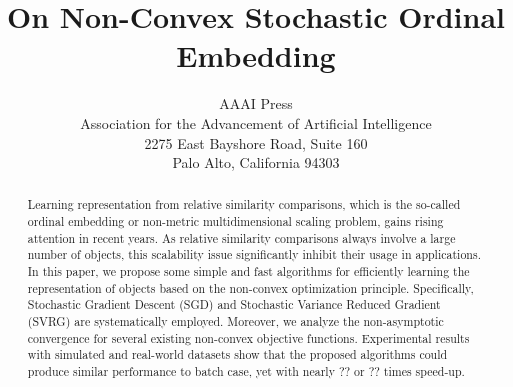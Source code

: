 \documentclass[letterpaper]{article}
\newcommand{\qqxu}[1]{\textcolor[rgb]{0.00,1.00,0.00}{#1}}
\begin{document}
		\title{On Non-Convex Stochastic Ordinal Embedding}
		\author
		{
			AAAI Press\\
			Association for the Advancement of Artificial Intelligence\\
			2275 East Bayshore Road, Suite 160\\
			Palo Alto, California 94303\\
		}

		\maketitle
		\begin{abstract}
			Learning representation from relative similarity comparisons, which is the so-called ordinal embedding or non-metric multidimensional scaling problem, \qqxu{gains rising attention in recent years. As relative similarity comparisons always involve a large number of objects, this scalability issue significantly inhibit their usage in applications. In this paper, we propose some simple and fast algorithms for efficiently learning the representation of objects based on the non-convex optimization principle. Specifically, Stochastic Gradient Descent (SGD) and Stochastic Variance Reduced Gradient (SVRG) are systematically employed. Moreover, we analyze the non-asymptotic convergence for several existing non-convex objective functions. Experimental results with simulated and real-world datasets show that the proposed algorithms could produce similar performance to batch case, yet with nearly ?? or ?? times speed-up.}

		\end{abstract}
\end{document}
